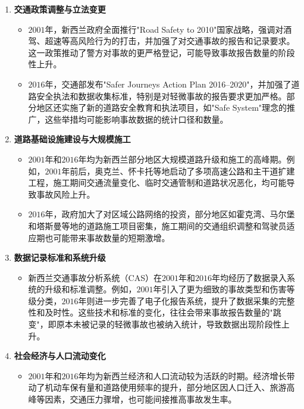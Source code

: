 \documentclass[12pt,a4paper]{article}
\begin{document}
\begin{enumerate}
\item \textbf{交通政策调整与立法变更}  
   \begin{itemize}
   \item $2001$年，新西兰政府全面推行"Road Safety to 2010"国家战略，强调对酒驾、超速等高风险行为的打击，并加强了对交通事故的报告和记录要求。这一政策推动了警方对事故的更严格登记，可能导致事故报告数量的阶段性上升。
   \item $2016$年，交通部发布"Safer Journeys Action Plan 2016–2020"，并加强了道路安全执法和数据收集标准，特别是对轻微事故的报告要求更加严格。部分地区还实施了新的道路安全教育和执法项目，如"Safe System"理念的推广，这些举措均可能影响事故数据的统计口径和数量。
   \end{itemize}

\item \textbf{道路基础设施建设与大规模施工}  
   \begin{itemize}
   \item $2001$年和$2016$年均为新西兰部分地区大规模道路升级和施工的高峰期。例如，$2001$年前后，奥克兰、怀卡托等地启动了多项高速公路和主干道扩建工程，施工期间交通流量变化、临时交通管制和道路状况恶化，均可能导致事故风险上升。
   \item $2016$年，政府加大了对区域公路网络的投资，部分地区如霍克湾、马尔堡和塔斯曼等地的道路施工项目密集，施工期间的交通组织调整和驾驶员适应期也可能带来事故数量的短期激增。
   \end{itemize}

\item \textbf{数据记录标准和系统升级}  
   \begin{itemize}
   \item 新西兰交通事故分析系统（CAS）在$2001$年和$2016$年均经历了数据录入系统的升级和标准调整。例如，$2001$年引入了更为细致的事故类型和伤害等级分类，$2016$年则进一步完善了电子化报告系统，提升了数据采集的完整性和及时性。这些技术和标准的变化，往往会带来事故报告数量的"跳变"，即原本未被记录的轻微事故也被纳入统计，导致数据出现阶段性上升。
   \end{itemize}

\item \textbf{社会经济与人口流动变化}  
   \begin{itemize}
   \item $2001$年和$2016$年均为新西兰经济和人口流动较为活跃的时期。经济增长带动了机动车保有量和道路使用频率的提升，部分地区因人口迁入、旅游高峰等因素，交通压力骤增，也可能间接推高事故发生率。
   \end{itemize}
\end{enumerate}
\end{document}
